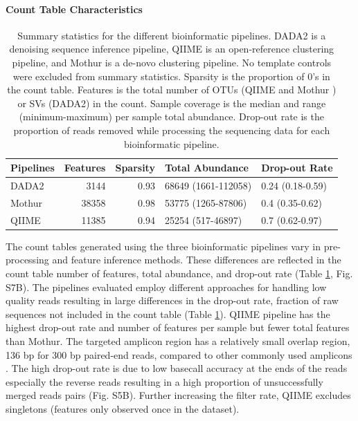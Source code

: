 \documentclass[linenumbers]{bmcart}
\begin{document}
\paragraph{Count Table Characteristics}
\begin{table}
\caption{\label{tab:pipeQA}Summary statistics for the different bioinformatic pipelines.
DADA2 is a denoising sequence inference pipeline, QIIME is an open-reference clustering
pipeline, and Mothur  is a de-novo clustering pipeline. No template controls were excluded
from summary statistics. Sparsity is the proportion of 0's in the count table. Features
is the total number of OTUs (QIIME and Mothur ) or SVs (DADA2) in the count. Sample
coverage is the median and range (minimum-maximum) per sample total abundance.
Drop-out rate is the proportion of reads removed while processing the sequencing data for each bioinformatic pipeline.}
\centering
\begin{tabular}[t]{lrrll}
\toprule
Pipelines & Features & Sparsity & Total Abundance & Drop-out Rate\\
\midrule
DADA2 & 3144 & 0.93 & 68649 (1661-112058) & 0.24 (0.18-0.59)\\
Mothur & 38358 & 0.98 & 53775 (1265-87806) & 0.4 (0.35-0.62)\\
QIIME & 11385 & 0.94 & 25254 (517-46897) & 0.7 (0.62-0.97)\\
\bottomrule
\end{tabular}
\end{table}

The count tables generated using the three bioinformatic pipelines vary in
pre-processing and feature inference methods. 
These differences are reflected in the count table number of features, total abundance,
and drop-out rate (Table \ref{tab:pipeQA}, Fig. S7B). The
pipelines evaluated employ different approaches for handling low quality
reads resulting in large differences in the drop-out rate, fraction
of raw sequences not included in the count table (Table
\ref{tab:pipeQA}). QIIME pipeline has the highest drop-out rate and
number of features per sample but fewer total features than Mothur. The
targeted amplicon region has a relatively small overlap region, 136 bp
for 300 bp paired-end reads, compared to other commonly used amplicons
\cite{kozich2013development, Walters2016-lf}. The high drop-out rate is
due to low basecall accuracy at the ends of the reads especially the
reverse reads resulting in a high proportion of unsuccessfully merged
reads pairs (Fig. S5B). Further increasing the
filter rate, QIIME excludes singletons (features only observed once in
the dataset).
\end{document}
